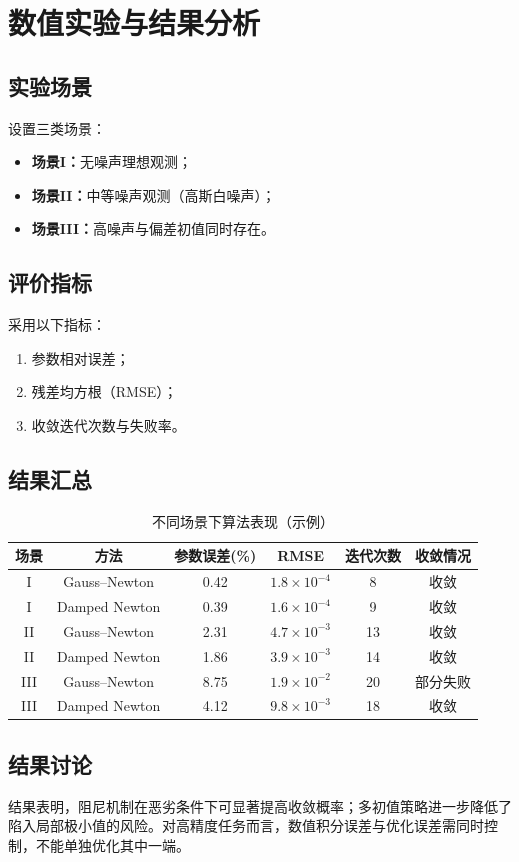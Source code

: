 \chapter{数值实验与结果分析}

\section{实验场景}
设置三类场景：
\begin{itemize}
  \item \textbf{场景I：}无噪声理想观测；
  \item \textbf{场景II：}中等噪声观测（高斯白噪声）；
  \item \textbf{场景III：}高噪声与偏差初值同时存在。
\end{itemize}

\section{评价指标}
采用以下指标：
\begin{enumerate}
  \item 参数相对误差；
  \item 残差均方根（RMSE）；
  \item 收敛迭代次数与失败率。
\end{enumerate}

\section{结果汇总}
\begin{table}[H]
\centering
\caption{不同场景下算法表现（示例）}
\begin{tabular}{cccccc}
\toprule
场景 & 方法 & 参数误差(\%) & RMSE & 迭代次数 & 收敛情况 \\
\midrule
I & Gauss--Newton & 0.42 & $1.8\times10^{-4}$ & 8 & 收敛 \\
I & Damped Newton & 0.39 & $1.6\times10^{-4}$ & 9 & 收敛 \\
II & Gauss--Newton & 2.31 & $4.7\times10^{-3}$ & 13 & 收敛 \\
II & Damped Newton & 1.86 & $3.9\times10^{-3}$ & 14 & 收敛 \\
III & Gauss--Newton & 8.75 & $1.9\times10^{-2}$ & 20 & 部分失败 \\
III & Damped Newton & 4.12 & $9.8\times10^{-3}$ & 18 & 收敛 \\
\bottomrule
\end{tabular}
\end{table}

\section{结果讨论}
结果表明，阻尼机制在恶劣条件下可显著提高收敛概率；多初值策略进一步降低了陷入局部极小值的风险。对高精度任务而言，数值积分误差与优化误差需同时控制，不能单独优化其中一端。
